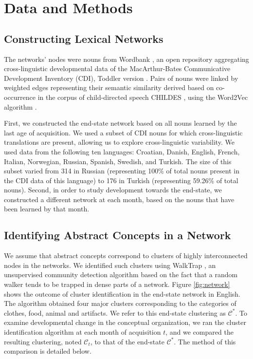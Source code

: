 \documentclass[11pt]{article}
\begin{document}
\section{Data and Methods}\label{data-and-methods}

\subsection{Constructing Lexical
Networks}\label{constructing-lexical-networks}

The networks' nodes were nouns from Wordbank \cite{frank2017}, an open
repository aggregating cross-linguistic developmental data of the
MacArthur-Bates Communicative Development Inventory (CDI), Toddler
version \cite{fenson94}. Pairs of nouns were linked by weighted edges
representing their semantic similarity derived based on co-occurrence in
the corpus of child-directed speech CHILDES \cite{macwhinney2014}, using
the Word2Vec algorithm \cite{mikolov2013}.

First, we constructed the end-state network based on all nouns learned
by the last age of acquisition. We used a subset of CDI nouns for which
cross-linguistic translations are present, allowing us to explore
cross-linguistic variability. We used data from the following ten
languages: Croatian, Danish, English, French, Italian, Norwegian,
Russian, Spanish, Swedish, and Turkish. The size of this subset varied
from 314 in Russian (representing 100\% of total nouns present in the
CDI data of this language) to 176 in Turkish (representing 59.26\% of
total nouns). Second, in order to study development towards the
end-state, we constructed a different network at each month, based on
the nouns that have been learned by that month.

\subsection{Identifying Abstract Concepts in a
Network}\label{identifying-abstract-concepts-in-a-network}

We assume that abstract concepts correspond to clusters of highly
interconnected nodes in the networks. We identified such clusters using
WalkTrap \cite{pons2006}, an unsupervised community detection algorithm
based on the fact that a random walker tends to be trapped in dense
parts of a network. Figure \ref{fig:network} shows the outcome of
cluster identification in the end-state network in English. The
algorithm obtained four major clusters corresponding to the categories
of clothes, food, animal and artifacts. We refer to this end-state
clustering as \(\mathcal{C}^*\). To examine developmental change in the
conceptual organization, we ran the cluster identification algorithm at
each month of acquisition \(t\), and we compared the resulting
clustering, noted \(\mathcal{C}_t\), to that of the end-state
\(\mathcal{C}^*\). The method of this comparison is detailed below.
\end{document}
